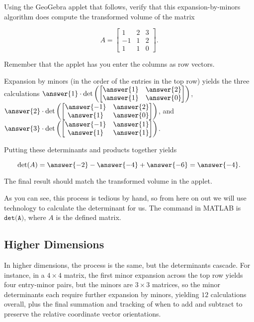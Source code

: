 \documentclass{ximera}
\begin{document}
\begin{example}
    Using the GeoGebra applet that follows, verify that this expansion-by-minors algorithm does compute the transformed volume of the matrix 
    
    $$A=\begin{bmatrix}
        1&2&3\\-1&1&2\\1&1&0
    \end{bmatrix}.$$

    \begin{center}
    \end{center}

    Remember that the applet has you enter the columns as row vectors. 

    Expansion by minors (in the order of the entries in the top row) yields the three calculations $\answer{1}\cdot\mbox{det}\left(\begin{bmatrix}
        \answer{1} & \answer{2}\\\answer{1}&\answer{0}
    \end{bmatrix}\right)$, $\answer{2}\cdot\mbox{det}\left(\begin{bmatrix}
        \answer{-1} & \answer{2}\\\answer{1}&\answer{0}
    \end{bmatrix}\right)$, and $\answer{3}\cdot\mbox{det}\left(\begin{bmatrix}
        \answer{-1} & \answer{1}\\\answer{1}&\answer{1}
    \end{bmatrix}\right)$.

    Putting these determinants and products together yields

    $$\mbox{det}(A)=\answer{-2}-\answer{-4}+\answer{-6}=\answer{-4}.$$

    The final result should match the transformed volume in the applet.
\end{example}

As you can see, this process is tedious by hand, so from here on out we will use technology to calculate the determinant for us. The command in MATLAB is $\texttt{det(A)}$, where $A$ is the defined matrix. 

\subsection*{Higher Dimensions}

In higher dimensions, the process is the same, but the determinants cascade. For instance, in a $4\times 4$ matrix, the first minor expansion across the top row yields four entry-minor pairs, but the minors are $3\times 3$ matrices, so the minor determinants each require further expansion by minors, yielding $12$ calculations overall, plus the final summation and tracking of when to add and subtract to preserve the relative coordinate vector orientations.
\end{document}

